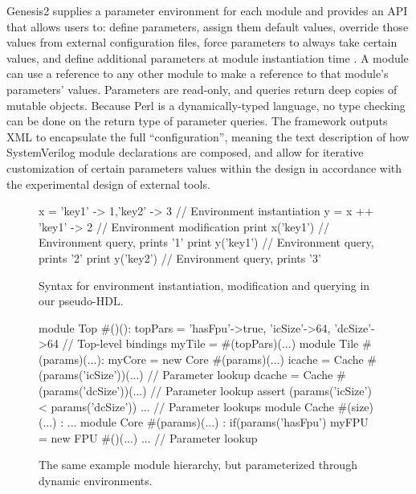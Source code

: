 Genesis2 supplies a parameter environment for each module and provides an API that allows users to:
define parameters,
assign them default values,
override those values from external configuration files,
force parameters to always take certain values,
and
define additional parameters at module instantiation time
\cite{shacham2011chip}.
A module can use a reference to any other module to make a reference to that module's parameters' values. 
Parameters are read-only, and queries return deep copies of mutable objects.
Because Perl is a dynamically-typed language, no type checking can be done on the return type of parameter queries.
The framework outputs XML to encapsulate the full ``configuration'', meaning the text description of how SystemVerilog module declarations are composed,
and allow for iterative customization of certain parameters values within the design in accordance with the experimental design of external tools.

\begin{figure}
\centering
\begin{phdl}
x = {'key1' -> 1,'key2' -> 3} // Environment instantiation
y = x ++ {'key1' -> 2}        // Environment modification
print x('key1')               // Environment query, prints '1'
print y('key1')               // Environment query, prints '2'
print y('key2')               // Environment query, prints '3'
\end{phdl}
\caption{Syntax for environment instantiation, modification and querying in our pseudo-HDL.}
\label{fig:env-phdl}
\end{figure}

\begin{figure}
\centering
\begin{phdl}
module Top #()():
  topPars = {'hasFpu'->true, 'icSize'->64, 'dcSize'->64} // Top-level bindings
  myTile = #(topPars)(...)
module Tile #(params)(...):
  myCore = new Core  #(params)(...)
  icache = Cache #(params('icSize'))(...)          // Parameter lookup
  dcache = Cache #(params('dcSize'))(...)          // Parameter lookup
  assert (params('icSize') < params('dcSize')) ... // Parameter lookups
module Cache #(size)(...) : ...
module Core  #(params)(...) :
  if(params('hasFpu') myFPU = new FPU #()(...) ... // Parameter lookup
\end{phdl} 
\caption{The same example module hierarchy, but parameterized through dynamic environments.}
\label{fig:env}
\end{figure}

